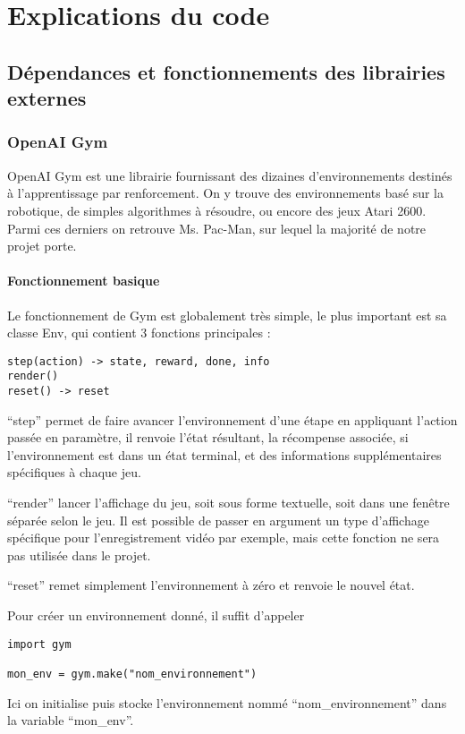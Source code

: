 \chapter{Explications du code}

\section{Dépendances et fonctionnements des librairies externes}

\subsection{OpenAI Gym}

OpenAI Gym est une librairie fournissant des dizaines d'environnements destinés à l'apprentissage par renforcement. On y trouve des environnements basé sur la robotique, de simples algorithmes à résoudre, ou encore des jeux Atari 2600. Parmi ces derniers on retrouve Ms. Pac-Man, sur lequel la majorité de notre projet porte.

\subsubsection{Fonctionnement basique}
Le fonctionnement de Gym est globalement très simple, le plus important est sa classe Env, qui contient 3 fonctions principales :
\begin{verbatim}
step(action) -> state, reward, done, info
render()
reset() -> reset
\end{verbatim}
``step'' permet de faire avancer l'environnement d'une étape en appliquant l'action passée en paramètre, il renvoie l'état résultant, la récompense associée, si l'environnement est dans un état terminal, et des informations supplémentaires spécifiques à chaque jeu.
\par
``render'' lancer l'affichage du jeu, soit sous forme textuelle, soit dans une fenêtre séparée selon le jeu. Il est possible de passer en argument un type d'affichage spécifique pour l'enregistrement vidéo par exemple, mais cette fonction ne sera pas utilisée dans le projet.
\par
``reset'' remet simplement l'environnement à zéro et renvoie le nouvel état.
\par
Pour créer un environnement donné, il suffit d'appeler
\begin{verbatim}
import gym

mon_env = gym.make("nom_environnement")
\end{verbatim}
Ici on initialise puis stocke l'environnement nommé ``nom\_environnement'' dans la variable ``mon\_env''.

